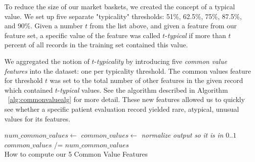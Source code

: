 To reduce the size of our market baskets, we created the concept of a \textsf{typical value}. We set up five separate "typicality" thresholds: 51\%, 62.5\%,
75\%, 87.5\%, and 90\%.  Given a number $t$ from the list above, and given
a feature from our feature set,
a specific value of the feature was called $t$-\textit{typical} if more
than $t$ percent of all records in the training set contained this value.

We aggregated the notion of $t$-\textit{typicality} by introducing
five \textit{common value features} into the dataset: one per typicality
threshold. The common values feature for threshold $t$ was set to the total number of other features in the given record which contained $t$-\textit{typical} values. See the algorithm described in Algorithm ~\ref{alg:commonvaluealg} for more detail.
These new features allowed us to quickly see whether a specific patient
evaluation record yielded rare, atypical, unusual values for its features.

\begin{algorithm}[H] \label{alg:commonvaluealg}
 
 
 \BlankLine
 $num\_common\_values \gets$  \;
 $common\_values \gets$  \;
 \emph{normalize output so it is in $0..1$} \\ 
 $common\_values$ /= $num\_common\_values$ \\
 \caption{How to compute our 5 Common Value Features}
\end{algorithm}
